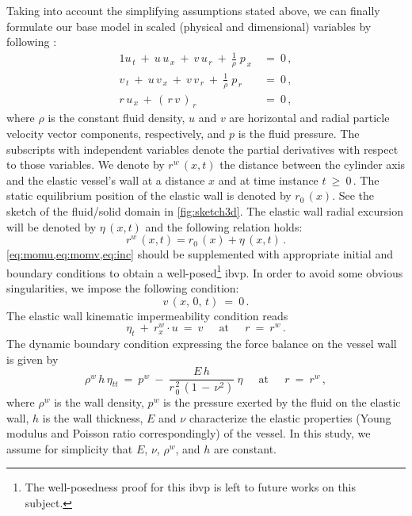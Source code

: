 \documentclass[alpha-refs, 12pt]{wiley-article}
\renewcommand{\geq}{\geqslant}
\begin{document}
Taking into account the simplifying assumptions stated above, we can finally formulate our base model in scaled (physical and dimensional) variables by following \cite{Mitsotakis2018, Mitsotakis2019}:
\begin{alignat}{1}
   u_{\,t}\ +\ u\,u_{\,x}\ +\ v\,u_{\,r}\ +\ \frac{1}{\rho}\;p_{\,x}\ &=\ 0\,, \label{eq:momu} \\
   v_{\,t}\ +\ u\,v_{\,x}\ +\ v\,v_{\,r}\ +\ \frac{1}{\rho}\;p_{\,r}\ &=\ 0\,, \label{eq:momv} \\
   r\,u_{\,x}\,+\,(\,r\,v\,)_{\,r}\ &=\ 0\,, \label{eq:inc}
\end{alignat}
where $\rho$ is the constant fluid density, $u$ and $v$ are horizontal and radial particle velocity vector components, respectively, and $p$ is the fluid pressure. The subscripts with independent variables denote the partial derivatives with respect to those variables. We denote by $r^{w}\,(x,t)$ the distance between the cylinder axis and the elastic vessel's wall at a distance $x$ and at time instance $t\ \geq\ 0\,$. The static equilibrium position of the elastic wall is denoted by $r_{0}\,(x)$. See the sketch of the fluid/solid domain in \cref{fig:sketch3d}. The elastic wall radial excursion will be denoted by $\eta\,(x,t)$ and the following relation holds:
\begin{equation*}
    r^{w}\,(x,t) = r_{0}\,(x) + \eta\,(x,t)\,.
\end{equation*}
\cref{eq:momu,eq:momv,eq:inc} should be supplemented with appropriate initial and boundary conditions to obtain a well-posed\footnote{The well-posedness proof for this \gls{ibvp} is left to future works on this subject.} \gls{ibvp}. In order to avoid some obvious singularities, we impose the following condition:
\begin{equation*}
    v\,(x,\,0,\,t)\ =\ 0\,.
\end{equation*}
The elastic wall kinematic impermeability condition reads
\begin{equation*}
  \eta_{t}\ +\ r^{w}_{x}\cdot u\ =\ v\ \quad\ \mbox{at}\ \quad\ r\ =\ r^{w}\,.
\end{equation*}
The dynamic boundary condition expressing the force balance on the vessel wall is given by
\begin{equation*}
    \rho^{w}\,h\,\eta_{tt}\ =\ p^{w}\ -\ \frac{E\,h}{r_{\,0}^{\,2}\,(1\,-\,\nu^2)}\:\eta\ \quad\ \mbox{at}\ \quad\ r\ =\ r^{w}\,,
\end{equation*}
where $\rho^{w}$ is the wall density, $p^{w}$ is the pressure exerted by the fluid on the elastic wall, $h$ is the wall thickness, $E$ and $\nu$ characterize the elastic properties (Young modulus and Poisson ratio correspondingly) of the vessel. In this study, we assume for simplicity that $E$, $\nu$, $\rho^{w}$, and $h$ are constant.
\end{document}
